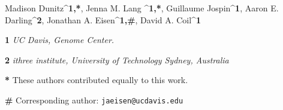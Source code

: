 Madison Dunitz^{\textbf{1,*}}, Jenna M. Lang ^{\textbf{1,*}}, Guillaume Jospin^{\textbf{1}}, Aaron E. Darling^{\textbf{2}}, Jonathan A. Eisen^{\textbf{1,#}}, David A. Coil^{\textbf{1}} 

\textbf{1} \textit{UC Davis, Genome Center.}

\textbf{2} \textit{ithree institute, University of Technology Sydney, Australia}

\textbf{*} These authors contributed equally to this work.

\textbf{#} Corresponding author: \verb|jaeisen@ucdavis.edu|